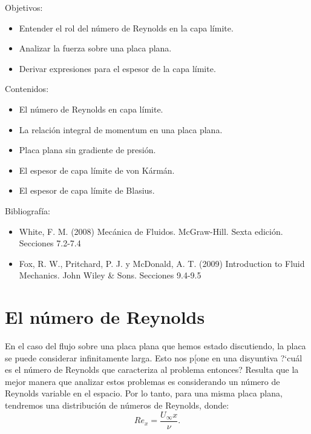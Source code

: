 \begin{framed}

Objetivos:
\begin{itemize}
    \item Entender el rol del número de Reynolds en la capa límite.
    \item Analizar la fuerza sobre una placa plana.
    \item Derivar expresiones para el espesor de la capa límite.
\end{itemize}

Contenidos:
\begin{itemize}
    \item El número de Reynolds en capa límite.
    \item La relación integral de momentum en una placa plana.
    \item Placa plana sin gradiente de presión.
    \item El espesor de capa límite de von Kármán.
    \item El espesor de capa límite de Blasius.
\end{itemize}

Bibliografía:
\begin{itemize}
    \item White, F. M. (2008) Mecánica de Fluidos. McGraw-Hill. Sexta edición. Secciones 7.2-7.4
    \item Fox, R. W., Pritchard, P. J. y McDonald, A. T. (2009) Introduction to Fluid Mechanics. John Wiley \& Sons. Secciones 9.4-9.5
\end{itemize}
\end{framed}

\section*{El número de Reynolds}

En el caso del flujo sobre una placa plana que hemos estado discutiendo, la placa se puede considerar infinitamente larga.
Esto nos p[one en una disyuntiva \mbox{?`}cuál es el número de Reynolds que caracteriza al problema entonces?
Resulta que la mejor manera que analizar estos problemas es considerando un número de Reynolds variable en el espacio.
Por lo tanto, para una misma placa plana, tendremos una distribución de números de Reynolds, donde:
%
\begin{equation}\label{eq:Re_capa}
Re_x = \frac{U_\infty x}{\nu}.
\end{equation}


